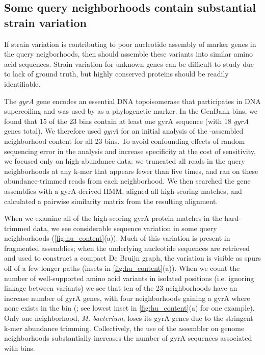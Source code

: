 \subsection*{Some query neighborhoods contain substantial strain variation}

If strain variation is contributing to poor nucleotide assembly of
marker genes in the query neigborhoods, then \plass should
assemble these variants into similar amino acid sequences.
Strain variation for unknown genes can be difficult to study due to
lack of ground truth, but highly conserved proteins should be readily
identifiable.

The {\em gyrA} gene encodes an essential DNA topoisomerase that
participates in DNA supercoiling and was used by \cite{Hu2016} as a
phylogenetic marker.  In the GenBank bins, we found that 15 of the 23
bins contain at least one gyrA sequence (with 18 {\em gyrA} genes
total).  We therefore used {\em gyrA} for an initial analysis of the
\plass-assembled neighborhood content for all 23 bins.  To avoid confounding effects of
random sequencing error in the analysis and increase specificity at the
cost of sensitivity, we focused only on high-abundance data:
we truncated all reads
in the query neighborhoods at any k-mer that appears fewer than five
times, and ran \plass on these abundance-trimmed reads from each
neighborhood.  We then searched the gene assemblies with a gyrA-derived
HMM, aligned all high-scoring matches, and calculated a pairwise similarity
matrix from the resulting alignment.

When we examine all of the high-scoring gyrA protein matches in the
hard-trimmed data, we see
considerable sequence variation in some query neighborhoods
(\autoref{fig:hu_content}(a)). Much of this variation is present in
fragmented \plass assemblies; when the underlying nucleotide sequences
are retrieved and used to construct a compact De Bruijn graph, the
variation is visible as spurs off of a few longer paths (insets in
\autoref{fig:hu_content}(a)). When we count the number of
well-supported amino acid variants in isolated positions (i.e. ignoring linkage between variants)
we see that ten of the 23 neighborhoods have an increase number of gyrA
genes, with four neighborhoods gaining a gyrA where none exists in
the bin (; see lowest inset
in \autoref{fig:hu_content}(a) for one example). Only one
neighborhood, {\em M. bacterium}, loses its gyrA genes due to the
stringent k-mer abundance trimming.
Collectively, the use of the \plass assembler on genome
neighborhoods substantially increases the number of gyrA sequences associated with bins.

